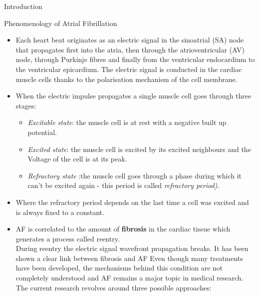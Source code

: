 \documentclass[final,hyperref={pdfpagelabels=false}]{beamer}
\begin{document}
\begin{frame}[t]
\begin{columns}[t]
\begin{column}{.465\textwidth}
\begin{block}{Introduction}
\end{block}



\begin{block}{Phenomenology of Atrial Fibrillation}


	\begin{itemize}
	\item Each heart beat originates as an electric signal in the sinoatrial (SA) node that propagates first into the atria, then through the atrioventricular (AV) node, through Purkinje fibres 		and finally from the ventricular endocardium to the ventricular epicardium. The electric signal is conducted in the cardiac muscle cells thanks to the polarisation mechanism of the cell 		membrane. 


	\item When the electric impulse propagates a single muscle cell goes through three stages:

		\begin{itemize}
 		 \item \textit{Excitable state}: the muscle cell is at rest with a negative built up potential.
  										
  		\item \textit{Excited state}: the muscle cell is excited by its excited neighbours and the Voltage of the cell is at its peak. 
  		\item \textit{Refractory state} :the muscle cell goes through a phase during which it can't be excited again - this period is called \textit{refractory period)}.
		\end{itemize}  

	\item Where the refractory period depends on the last time a cell was excited and is always fixed to a constant.\\



	\item AF is correlated to the amount of \textbf{ fibrosis} in the cardiac tissue which generates a process called reentry. \\
	During reentry the electric signal wavefront propagation breaks. It has been shown a clear link between fibrosis and AF
	Even though many treatments have been developed, the mechanisms behind this condition are not completely understood and AF remains a major topic in medical research. \\
	The current research revolves around three possible approaches:
	\end{itemize}


\end{block}
\end{column}
\end{columns}
\end{frame}
\end{document}
